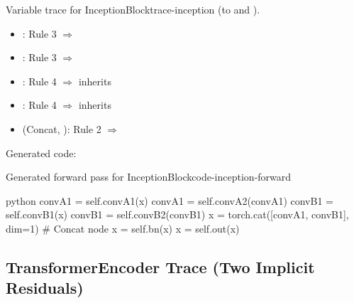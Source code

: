 \documentclass{nngraph-en}
\begin{document}
\begin{exbox}{Variable trace for InceptionBlock}{trace-inception}
 (to  and ).

\begin{itemize}
    \item {}: Rule 3 $\Rightarrow$ 
    \item {}: Rule 3 $\Rightarrow$ 
    \item {}: Rule 4 $\Rightarrow$ inherits 
    \item {}: Rule 4 $\Rightarrow$ inherits 
    \item {} (Concat, ): Rule 2
    $\Rightarrow$ 
\end{itemize}

Generated code:
\begin{codebox}{Generated forward pass for InceptionBlock}{code-inception-forward}
\begin{amzcode}{python}
convA1 = self.convA1(x)
convA1 = self.convA2(convA1)
convB1 = self.convB1(x)
convB1 = self.convB2(convB1)
x      = torch.cat([convA1, convB1], dim=1)  # Concat node
x      = self.bn(x)
x      = self.out(x)
\end{amzcode}
\end{codebox}
\end{exbox}

\subsection{TransformerEncoder Trace (Two Implicit Residuals)}
\end{document}
